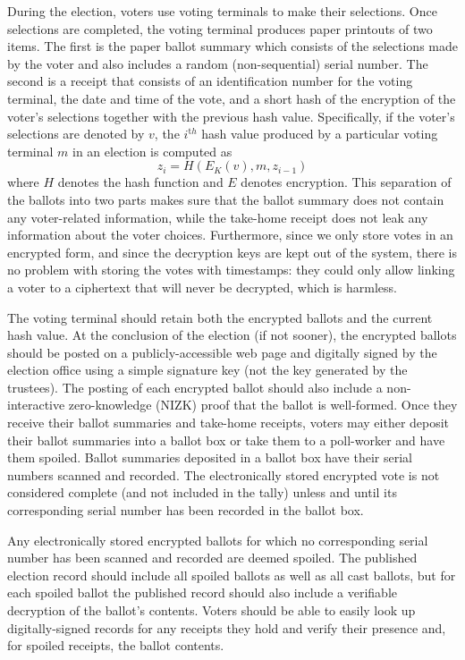 During the election, voters use voting terminals to make their
selections.  Once selections are completed, the voting terminal
produces paper printouts of two items.  The first is the paper ballot summary
which consists of the selections made by the voter and also includes a
random (non-sequential) serial number.  The second is a receipt that
consists of an identification number for the voting terminal,
the date and time of the vote, and a short hash of the encryption of
the voter's selections together with the previous hash value.
Specifically, if the voter's selections are denoted by $v$, the
$i^{{\mathrm th}}$ hash value produced by a particular voting terminal $m$ in an election is computed as
\[
z_i=H(E_K(v),m,z_{i-1} )
\]
\noindent
where $H$ denotes the hash function and $E$ denotes encryption.  This
separation of the ballots into two parts makes sure that the ballot
summary does not contain any voter-related information, while the
take-home receipt does not leak any information about the voter
choices.  Furthermore, since we only store votes in an encrypted form,
and since the decryption keys are kept out of the system, there is no
problem with storing the votes with timestamps: they could only allow
linking a voter to a ciphertext that will never be decrypted, which is
harmless.

The voting terminal should retain both the encrypted ballots and the current hash value.  At the conclusion of the election (if not sooner), the encrypted ballots should be posted on a publicly-accessible web page and digitally signed by the election office using a simple signature key (not the key generated by the trustees).  The posting of each encrypted ballot should also include a non-interactive zero-knowledge (NIZK) proof that the ballot is well-formed.
Once they receive their ballot summaries and take-home receipts, voters may either deposit their ballot summaries into a ballot box or take them to a poll-worker and have them spoiled.  Ballot summaries deposited in a ballot box have their serial numbers scanned and recorded.  The electronically stored encrypted vote is not considered complete (and not included in the tally) unless and until its corresponding serial number has been recorded in the ballot box.

Any electronically stored encrypted ballots for which no corresponding serial number has been scanned and recorded are deemed spoiled.  The published election record should include all spoiled ballots as well as all cast ballots, but for each spoiled ballot the published record should also include a verifiable decryption of the ballot's contents.  Voters should be able to easily look up digitally-signed records for any receipts they hold and verify their presence and, for spoiled receipts, the ballot contents.

